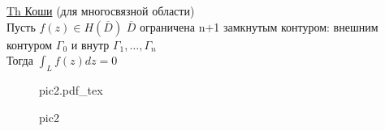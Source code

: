 \documentclass[a4paper]{article}
\newcommand{\incfig}[1]{%
\def\svgwidth{\columnwidth}
{#1.pdf_tex}
}
\begin{document}
\begin{tcolorbox}
\underline{Th Коши} (для многосвязной области)\\
Пусть $ f(z) \in H(\overline{D}) $ $ \overline{D} $ ограничена n+1 замкнутым
контуром: внешним контуром $ \Gamma_0 $ и внутр $ \Gamma_1, \dots, \Gamma_n $ \\
Тогда $ \int_L f(z)dz = 0 $ 
\end{tcolorbox}
\begin{figure}[ht]
    \centering
    \incfig{pic2}
    \caption{pic2}
    \label{fig:pic2}
\end{figure}
\end{document}
